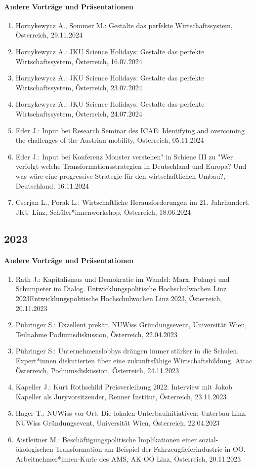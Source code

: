 \paragraph{Andere Vorträge und Präsentationen}
\begin{enumerate}
	\item Hornykewycz A., Sommer M.: Gestalte das perfekte Wirtschaftssystem, Österreich, 29.11.2024
	\item Hornykewycz A.: JKU Science Holidays: Gestalte das perfekte Wirtschaftssystem, Österreich, 16.07.2024
	\item Hornykewycz A.: JKU Science Holidays: Gestalte das perfekte Wirtschaftssystem, Österreich, 23.07.2024
	\item Hornykewycz A.: JKU Science Holidays: Gestalte das perfekte Wirtschaftssystem, Österreich, 24.07.2024
	\item Eder J.: Input bei Research Seminar des ICAE: Identifying and overcoming the challenges of the Austrian mobility, Österreich, 05.11.2024
	\item Eder J.: Input bei Konferenz \glqq Monster verstehen" in Schiene III zu "Wer verfolgt welche Transformationsstrategien in Deutschland und Europa? Und was wäre eine progressive Strategie für den wirtschaftlichen Umbau?\grqq{}, Deutschland, 16.11.2024
	\item Cserjan L., Porak L.: Wirtschaftliche Herausforderungen im 21. Jahrhundert. JKU Linz, Schüler*innenworkshop, Österreich, 18.06.2024
\end{enumerate}
\subsection*{2023}
\paragraph{Andere Vorträge und Präsentationen}
\begin{enumerate}
	\item Rath J.: Kapitalismus und Demokratie im Wandel: Marx, Polanyi und Schumpeter im Dialog. Entwicklungspolitische Hochschulwochen Linz 2023Entwicklungspolitische Hochschulwochen Linz 2023, Österreich, 20.11.2023
	\item Pühringer S.: Exzellent prekär. NUWiss Gründungsevent, Universität Wien, Teilnahme Podiumsdiskussion, Österreich, 22.04.2023
	\item Pühringer S.: Unternehmenslobbys drängen immer stärker in die Schulen. Expert*innen diskutierten über eine zukunftsfähige Wirtschaftsbildung. Attac Österreich, Podiumsdiskussion, Österreich, 24.11.2023
	\item Kapeller J.: Kurt Rothschild Preisverleihung 2022. Interview mit Jakob Kapeller als Juryvorsitzender, Renner Institut, Österreich, 23.11.2023
	\item Hager T.: NUWiss vor Ort. Die lokalen Unterbauinitiativen: Unterbau Linz. NUWiss Gründungsevent, Universität Wien, Österreich, 22.04.2023
	\item Aistleitner M.: Beschäftigungspolitische Implikationen einer sozial-ökologischen Transformation am Beispiel der Fahrzeuglieferindustrie in OÖ. Arbeitnehmer*innen-Kurie des AMS, AK OÖ Linz, Österreich, 20.11.2023
\end{enumerate}
